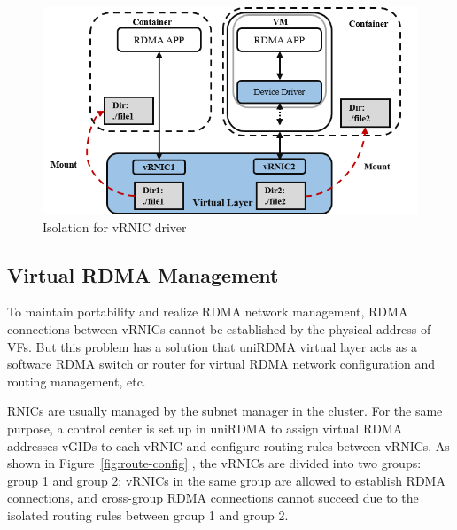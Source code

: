 \begin{figure}[!ht]
	\centering
	\includegraphics[width=1.0\linewidth]{images/interface-isolate}
	\caption{Isolation for vRNIC driver}
	\label{fig:interface-isolate}
\end{figure}

\subsection{Virtual RDMA Management}
To maintain portability and realize RDMA network management, RDMA connections between vRNICs cannot be established by the physical address of VFs. But this problem has a solution that uniRDMA virtual layer acts as a software RDMA switch or router for virtual RDMA network configuration and routing management, etc.

RNICs are usually managed by the subnet manager in the cluster. For the same purpose, a control center is set up in uniRDMA to assign virtual RDMA addresses vGIDs to each vRNIC and configure routing rules between vRNICs. As shown in Figure~\ref{fig:route-config} , the vRNICs are divided into two groups: group 1 and group 2; vRNICs in the same group are allowed to establish RDMA connections, and cross-group RDMA connections cannot succeed due to the isolated routing rules between group 1 and group 2.

